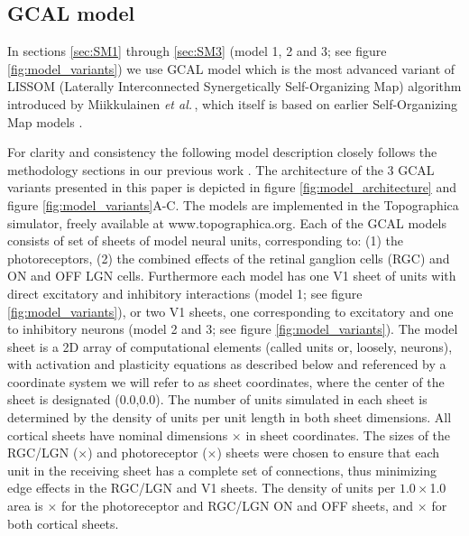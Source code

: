 \documentclass[utf8]{frontiersSCNS}
\newcommand{\etal}{\textit{et al.}}
\begin{document}
\subsection{GCAL model}\label{sec:gcal}

In sections \ref{sec:SM1} through \ref{sec:SM3} (model 1, 2 and 3; see figure \ref{fig:model_variants}) we use GCAL model \citep{Stevens2013}  which is the most advanced variant of LISSOM (Laterally Interconnected Synergetically Self-Organizing Map) algorithm introduced by Miikkulainen \etal\,\citep{CMVC}, which itself is based on earlier Self-Organizing Map models \citep{Kohonen1982}.

For clarity and consistency the following model description closely follows the methodology sections in our 
previous work \citep{Stevens2013,Antolik2011}. The architecture of the 3 GCAL variants presented in this 
paper is depicted in figure \ref{fig:model_architecture} and figure \ref{fig:model_variants}A-C. The models are implemented in the Topographica simulator, freely available at www.topographica.org. 
Each of the GCAL models consists of set of sheets of model neural units, corresponding to: (1) the photoreceptors, (2) the combined effects of the retinal ganglion cells (RGC) and ON and OFF LGN cells. Furthermore each model has one V1 sheet of units with direct excitatory and inhibitory interactions (model 1; see figure \ref{fig:model_variants}), or two 
V1 sheets, one corresponding to excitatory and one to inhibitory neurons (model 2 and 3; see figure \ref{fig:model_variants}).
The model sheet is a 2D array of computational elements (called units or, loosely, neurons), with activation and plasticity equations as 
described below and referenced by a coordinate system we will refer to as sheet coordinates, where the center of the sheet is designated (0.0,0.0).  
The number of units simulated in each sheet is determined by the density of units per unit length in both sheet dimensions. 
All cortical sheets have nominal dimensions $\times$ in sheet coordinates. The sizes of the
RGC/LGN ($\times$) and photoreceptor ($\times$) sheets
were chosen to ensure that each unit in the receiving sheet has a complete set of connections, thus minimizing edge effects in the
RGC/LGN and V1 sheets. The density of units per $1.0\times$1.0 area is $\times$ 
for the photoreceptor and RGC/LGN ON and OFF sheets, and $\times$ for both cortical sheets.
\end{document}
